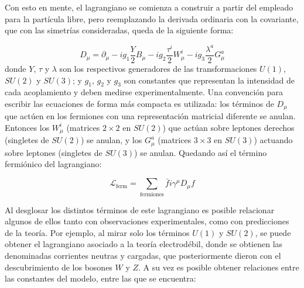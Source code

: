 Con esto en mente, el lagrangiano se comienza a construir a partir del empleado para la partícula libre, pero reemplazando la derivada ordinaria con la covariante, que con las simetrías consideradas, queda de la siguiente forma:


\begin{equation}
D_{\mu} = \partial_{\mu} - i g_{1} \frac{Y}{2}B_{\mu} - i g_{2} \frac{\tau^{i}}{2}W_{\mu}^{i} - i g_{3} \frac{\lambda^{a}}{2}G_{\mu}^{a}
\label{eq:cov_deriv}
\end{equation}
%
donde $Y$, $\tau$ y $\lambda$ son los respectivos generadores de las transformaciones $U(1)$, $SU(2)$ y $SU(3)$; y $g_1$, $g_2$ y $g_3$ son constantes que representan la intensidad de cada acoplamiento y deben medirse experimentalmente. Una convención para escribir las ecuaciones de forma más compacta es utilizada: los términos de $D_{\mu}$ que actúen en los fermiones con una representación matricial diferente se anulan. Entonces los $W_{\mu}^{i}$ (matrices $2\times2$ en $SU(2)$) que actúan sobre leptones derechos (singletes de $SU(2)$) se anulan, y los $G_{\mu}^{a}$ (matrices $3\times3$ en $SU(3)$) actuando sobre leptones (singletes de $SU(3)$) se anulan. Quedando así el término fermiónico del lagrangiano:

\begin{equation}
\mathcal{L}_{\text{ferm}} = \sum_{\text{fermiones}} \bar{f}i\gamma^{\mu}D_{\mu}f
\end{equation}

Al desglosar los distintos términos de este lagrangiano es posible relacionar algunos de ellos tanto con observaciones experimentales, como con predicciones de la teoría. Por ejemplo, al mirar solo los términos $U(1)$ y $SU(2)$, se puede obtener el lagrangiano asociado a la teoría electrodébil, donde se obtienen las denominadas corrientes neutras y cargadas, que posteriormente dieron con el descubrimiento de los bosones $W$ y $Z$. A su vez es posible obtener relaciones entre las constantes del modelo, entre las que se encuentra:



